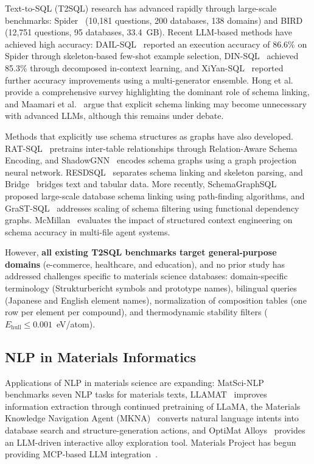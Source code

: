\documentclass[5p,twocolumn]{elsarticle}
\begin{document}
Text-to-SQL (T2SQL) research has advanced rapidly through large-scale benchmarks:
Spider~\citep{yu2018spider} (10,181 questions, 200 databases, 138 domains) and
BIRD~\citep{li2024bird} (12,751 questions, 95 databases, 33.4~GB).
Recent LLM-based methods have achieved high accuracy:
DAIL-SQL~\citep{gao2023dail} reported an execution accuracy of 86.6\% on Spider through skeleton-based few-shot example selection,
DIN-SQL~\citep{pourreza2024dinsql} achieved 85.3\% through decomposed in-context learning, and
XiYan-SQL~\citep{gao2024xiyan} reported further accuracy improvements using a multi-generator ensemble.
Hong et al.~\citep{hong2024survey} provide a comprehensive survey highlighting the dominant role of schema linking,
and Maamari et al.~\citep{maamari2024schema} argue that explicit schema linking may become unnecessary with advanced LLMs,
although this remains under debate.

Methods that explicitly use schema structures as graphs have also developed.
RAT-SQL~\citep{wang2020ratsql} pretrains inter-table relationships through Relation-Aware Schema Encoding, and
ShadowGNN~\citep{chen2021shadowgnn} encodes schema graphs using a graph projection neural network.
RESDSQL~\citep{li2023resdsql} separates schema linking and skeleton parsing, and
Bridge~\citep{lin2020bridge} bridges text and tabular data.
More recently, SchemaGraphSQL~\citep{safdarian2026schemagraphsql} proposed large-scale database schema linking using path-finding algorithms, and
GraST-SQL~\citep{hoang2025grastsql} addresses scaling of schema filtering using functional dependency graphs.
McMillan~\citep{mcmillan2026context} evaluates the impact of structured context engineering on
schema accuracy in multi-file agent systems.

However, \textbf{all existing T2SQL benchmarks target general-purpose domains}
(e-commerce, healthcare, and education), and no prior study has addressed
challenges specific to materials science databases:
domain-specific terminology (Strukturbericht symbols and prototype names),
bilingual queries (Japanese and English element names),
normalization of composition tables (one row per element per compound), and
thermodynamic stability filters ($E_\text{hull} \leq 0.001$~eV/atom).

\subsection{NLP in Materials Informatics}

Applications of NLP in materials science are expanding:
MatSci-NLP~\citep{song2023matscnlp} benchmarks seven NLP tasks for materials texts,
LLAMAT~\citep{mishra2024llamat} improves information extraction through continued pretraining of LLaMA,
the Materials Knowledge Navigation Agent (MKNA)~\citep{zhuang2026mkna} converts
natural language intents into database search and structure-generation actions, and
OptiMat Alloys~\citep{hu2026optimat} provides an LLM-driven interactive alloy exploration tool.
Materials Project has begun providing MCP-based LLM integration~\citep{mp_mcp2025}.
\end{document}
